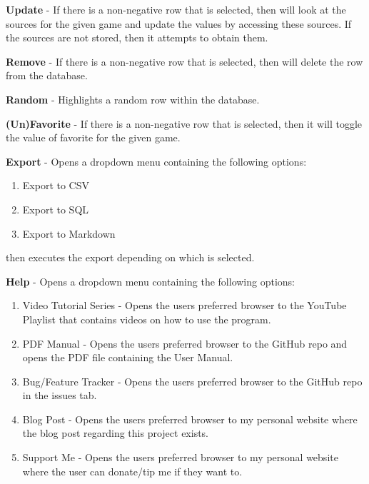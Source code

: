 \textbf{Update} - If there is a non-negative row that is selected, then will
look at the sources for the given game and update the values by
accessing these sources. If the sources are not stored, then it
attempts to obtain them.

\textbf{Remove} - If there is a non-negative row that is selected, then will
delete the row from the database.

\textbf{Random} - Highlights a random row within the database.

\textbf{(Un)Favorite} - If there is a non-negative row that is
selected, then it will toggle the value of favorite for the given game.

\textbf{Export} - Opens a dropdown menu containing the following options:
\begin{enumerate}
	\item Export to CSV
	\item Export to SQL
	\item Export to Markdown
\end{enumerate}
then executes the export depending on which is selected.

\textbf{Help} - Opens a dropdown menu containing the following options:
\begin{enumerate}
	\item Video Tutorial Series - Opens the users preferred browser to
		the YouTube Playlist that contains videos on how to use the program.
	\item PDF Manual - Opens the users preferred browser to the GitHub
		repo and opens the PDF file containing the User Manual.
	\item Bug/Feature Tracker - Opens the users preferred browser to the
		GitHub repo in the issues tab.
	\item Blog Post - Opens the users preferred browser to my personal
		website where the blog post regarding this project exists.
	\item Support Me - Opens the users preferred browser to my personal
		website where the user can donate/tip me if they want to.
\end{enumerate}

